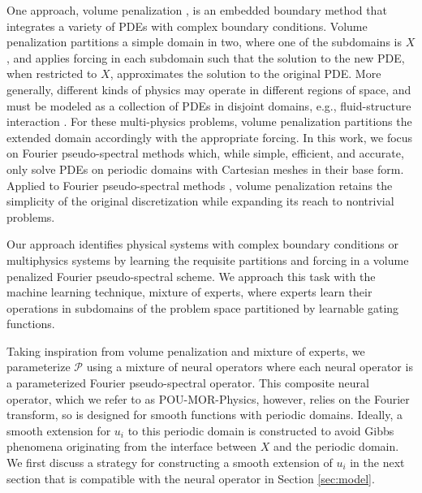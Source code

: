 One approach, volume penalization \cite{brown2014characteristic,kadoch2012volume}, is an embedded boundary method that integrates a variety of PDEs with complex boundary conditions. Volume penalization partitions a simple domain in two, where one of the subdomains is $X$, and applies forcing in each subdomain such that the solution to the new PDE, when restricted to $X$, approximates the solution to the original PDE. More generally, different kinds of physics may operate in different regions of space, and must be modeled as a collection of PDEs in disjoint domains, e.g., fluid-structure interaction \cite{engels2015numerical}. For these multi-physics problems, volume penalization partitions the extended domain accordingly with the appropriate forcing. In this work, we focus on Fourier pseudo-spectral methods which, while simple, efficient, and accurate,  only solve PDEs on periodic domains with Cartesian meshes in their base form. Applied to Fourier pseudo-spectral methods \cite{kolomenskiy2009fourier}, volume penalization retains the simplicity of the original discretization while expanding its reach to nontrivial problems. 

Our approach identifies physical systems with complex boundary conditions or multiphysics systems by learning the requisite partitions and forcing in a volume penalized Fourier pseudo-spectral scheme. We approach this task with the machine learning technique, mixture of experts, where experts learn their operations in subdomains of the problem space partitioned by learnable gating functions. 

Taking inspiration from volume penalization and mixture of experts, we parameterize $\mathcal{P}$ using a mixture of neural operators where each neural operator is a parameterized Fourier pseudo-spectral operator. This composite neural operator, which we refer to as POU-MOR-Physics, however, relies on the Fourier transform, so is designed for smooth functions with periodic domains. Ideally, a smooth extension for $u_i$ to this periodic domain is constructed to avoid Gibbs phenomena originating from the interface between $X$ and the periodic domain. We first discuss a strategy for constructing a smooth extension of $u_i$ in the next section that is compatible with the neural operator in Section \ref{sec:model}. 







